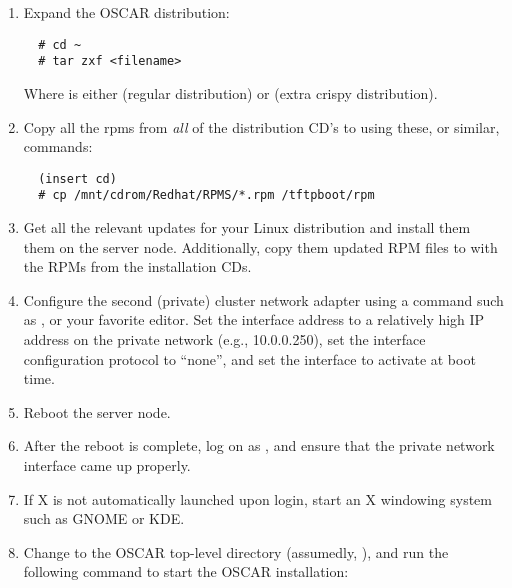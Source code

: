 \begin {enumerate}
\item Expand the OSCAR distribution:

\begin{verbatim}
  # cd ~
  # tar zxf <filename>
\end{verbatim}
  
  Where  is either
   (regular distribution) or
   (extra crispy
    distribution).


\item Copy all the rpms from \emph{all} of the distribution CD's to
   using these, or similar, commands:

\begin{verbatim}
  (insert cd)
  # cp /mnt/cdrom/Redhat/RPMS/*.rpm /tftpboot/rpm
\end{verbatim}


\item Get all the relevant updates for your Linux distribution and
  install them them on the server node.  Additionally, copy them
  updated RPM files to  with the RPMs from the
  installation CDs.
  

\item Configure the second (private) cluster network adapter using a
  command such as , or your favorite editor.
  Set the interface address to a relatively high IP address on the
  private network (e.g., 10.0.0.250), set the interface configuration
  protocol to ``none'', and set the interface to activate at boot
  time.  


\item Reboot the server node.  
  
\item After the reboot is complete, log on as , and ensure
  that the private network interface came up properly.
  
\item If X is not automatically launched upon  login, start
  an X windowing system such as GNOME or KDE.
  
\item Change to the OSCAR top-level directory (assumedly,
  ), and run the following
  command to start the OSCAR installation:


\end{enumerate}
